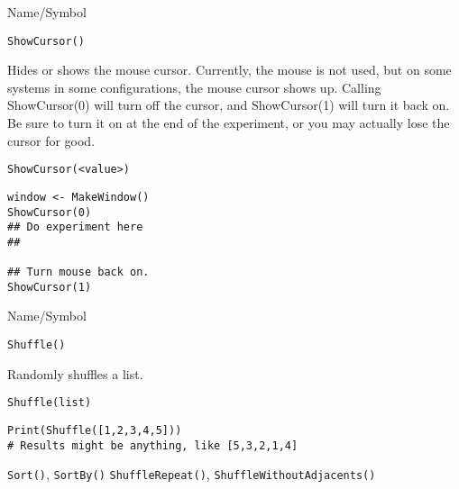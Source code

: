\begin{desc}{Name/Symbol}
\item[Name/Symbol]  	\verb+ShowCursor()+

\item[Description] Hides or shows the mouse cursor.  Currently, the
  mouse is not used, but on some systems in some configurations, the
  mouse cursor shows up.  Calling ShowCursor(0) will turn off the
  cursor, and ShowCursor(1) will turn it back on.  Be sure to turn it
  on at the end of the experiment, or you may actually lose the cursor
  for good.

\item[Usage]
\begin{verbatim}
ShowCursor(<value>)
\end{verbatim}

\item[Example]
\begin{verbatim}
window <- MakeWindow()
ShowCursor(0)
## Do experiment here
##

## Turn mouse back on.
ShowCursor(1)

\end{verbatim}

\item[See Also] 

\end{desc}

\rl




\begin{desc}{Name/Symbol}
\item[Name/Symbol] 	\verb+Shuffle()+

\item[Description] 	Randomly shuffles a list.

\item[Usage]    
\begin{verbatim}
Shuffle(list)
\end{verbatim}

\item[Example]
\begin{verbatim}
Print(Shuffle([1,2,3,4,5]))
# Results might be anything, like [5,3,2,1,4]
\end{verbatim}

\item[See Also]    	\verb+Sort()+, \verb+SortBy()+ \verb+ShuffleRepeat()+,
                    \verb+ShuffleWithoutAdjacents()+
\end{desc}

\rl




